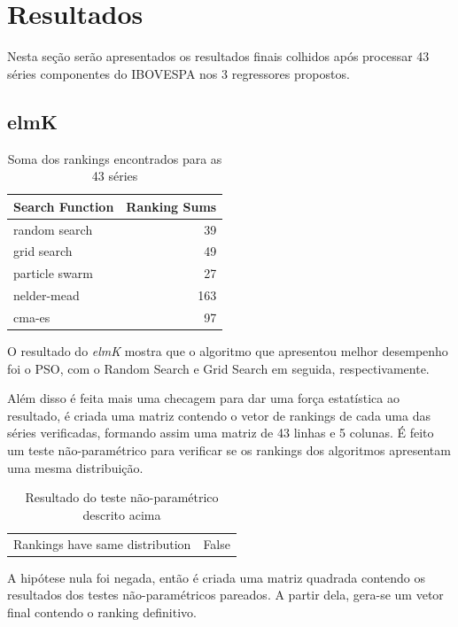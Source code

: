 \documentclass[preprint,12pt]{elsarticle}
\begin{document}
\section{Resultados}

Nesta seção serão apresentados os resultados finais colhidos após processar 43 séries componentes do IBOVESPA nos 3 regressores propostos.


\subsection{elmK}



\begin{table}[h]
	\centering
	\begin{tabular}{lr}
		\hline
		Search Function   &   Ranking Sums \\
		\hline
		random search     &             39 \\
		grid search       &             49 \\
		particle swarm    &             27 \\
		nelder-mead       &            163 \\
		cma-es            &             97 \\
		\hline
	\end{tabular}
	\caption{Soma dos rankings encontrados para as 43 séries}
\end{table}

O resultado do \textit{elmK} mostra que o algoritmo que apresentou melhor desempenho foi o PSO, com o Random Search e Grid Search em seguida, respectivamente.

Além disso é feita mais uma checagem para dar uma força estatística ao resultado, é criada uma matriz contendo o vetor de rankings de cada uma das séries verificadas, formando assim uma matriz de 43 linhas e 5 colunas. É feito um teste não-paramétrico para verificar se os rankings dos algoritmos apresentam uma mesma distribuição.

\begin{table}[h]
	\centering
	\begin{tabular}{l r}
		
		Rankings have same distribution  &  False \\
		
	\end{tabular}
	\caption{Resultado do teste não-paramétrico descrito acima}
\end{table}

A hipótese nula foi negada, então é criada uma matriz quadrada contendo os resultados dos testes não-paramétricos pareados. A partir dela, gera-se um vetor final contendo o ranking definitivo.
\end{document}

